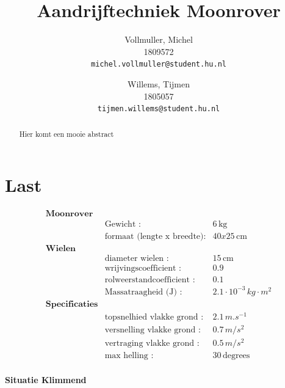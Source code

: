 \documentclass{article}
\title{Aandrijftechniek Moonrover}
\author{
  Vollmuller, Michel\\
  1809572\\
  \texttt{michel.vollmuller@student.hu.nl}
  \and
  Willems, Tijmen\\
  1805057\\
  \texttt{tijmen.willems@student.hu.nl}
}
\begin{document}
\maketitle

\begin{abstract}
    Hier komt een mooie abstract
\end{abstract}



\section{Last}

\begin{align*}
  \textbf{Moonrover}\\
  &\text{Gewicht :} & 6 \, \text{kg} \\
  &\text{formaat (lengte x breedte):} & 40x25 \, \text{cm}\\
  \textbf{Wielen}\\
  &\text{diameter wielen :} & 15 \, \text{cm}\\
  &\text{wrijvingscoefficient :} & 0.9 \, \\
  &\text{rolweerstandcoefficient :} & 0.1 \, \\
  &\text{Massatraagheid (J) :} & \text{$2.1 \cdot 10^{-3}$} \, \text{$kg \cdot m^{2}$}\\
  \textbf{Specificaties}\\
  &\text{topsnelhied vlakke grond :} & 2.1 \, \text{$m.s^{-1}$}\\
  &\text{versnelling vlakke grond :} & 0.7 \, \text{$m/s^{2}$}\\
  &\text{vertraging vlakke grond :} & 0.5 \, \text{$m/s^{2}$}\\
  &\text{max helling :} & 30 \, \text{degrees}
\end{align*}
\\
\textbf{Situatie Klimmend}
\end{document}
